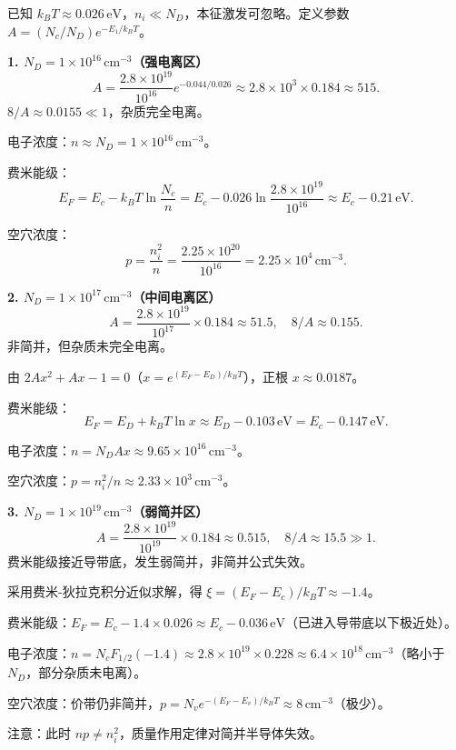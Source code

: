 \begin{derivationbox}[标准解题过程]
已知 $k_BT\approx0.026\,\text{eV}$，$n_i\ll N_D$，本征激发可忽略。定义参数 $A=(N_c/N_D)e^{-E_1/k_BT}$。

\textbf{1. $N_D=1\times10^{16}\,\text{cm}^{-3}$（强电离区）}
\[
A=\frac{2.8\times10^{19}}{10^{16}}e^{-0.044/0.026}\approx2.8\times10^3\times0.184\approx515.
\]
$8/A\approx0.0155\ll1$，杂质完全电离。

电子浓度：$n\approx N_D=1\times10^{16}\,\text{cm}^{-3}$。

费米能级：
\[
E_F=E_c-k_BT\ln\frac{N_c}{n}=E_c-0.026\ln\frac{2.8\times10^{19}}{10^{16}}\approx E_c-0.21\,\text{eV}.
\]

空穴浓度：
\[
p=\frac{n_i^2}{n}=\frac{2.25\times10^{20}}{10^{16}}=2.25\times10^4\,\text{cm}^{-3}.
\]

\textbf{2. $N_D=1\times10^{17}\,\text{cm}^{-3}$（中间电离区）}
\[
A=\frac{2.8\times10^{19}}{10^{17}}\times0.184\approx51.5,\quad 8/A\approx0.155.
\]
非简并，但杂质未完全电离。

由 $2Ax^2+Ax-1=0$（$x=e^{(E_F-E_D)/k_BT}$），正根 $x\approx0.0187$。

费米能级：
\[
E_F=E_D+k_BT\ln x\approx E_D-0.103\,\text{eV}=E_c-0.147\,\text{eV}.
\]

电子浓度：$n=N_DAx\approx9.65\times10^{16}\,\text{cm}^{-3}$。

空穴浓度：$p=n_i^2/n\approx2.33\times10^3\,\text{cm}^{-3}$。

\textbf{3. $N_D=1\times10^{19}\,\text{cm}^{-3}$（弱简并区）}
\[
A=\frac{2.8\times10^{19}}{10^{19}}\times0.184\approx0.515,\quad 8/A\approx15.5\gg1.
\]
费米能级接近导带底，发生弱简并，非简并公式失效。

采用费米-狄拉克积分近似求解，得 $\xi=(E_F-E_c)/k_BT\approx-1.4$。

费米能级：$E_F=E_c-1.4\times0.026\approx E_c-0.036\,\text{eV}$（已进入导带底以下极近处）。

电子浓度：$n=N_cF_{1/2}(-1.4)\approx2.8\times10^{19}\times0.228\approx6.4\times10^{18}\,\text{cm}^{-3}$（略小于 $N_D$，部分杂质未电离）。

空穴浓度：价带仍非简并，$p=N_ve^{-(E_F-E_v)/k_BT}\approx8\,\text{cm}^{-3}$（极少）。

注意：此时 $np\neq n_i^2$，质量作用定律对简并半导体失效。
\end{derivationbox}

